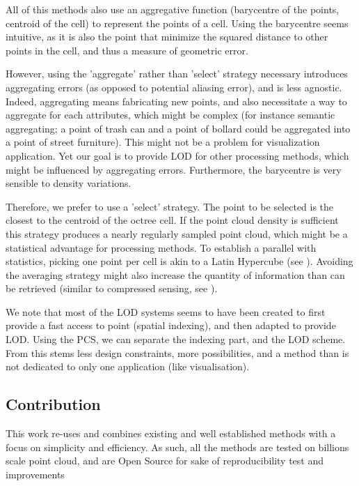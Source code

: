 	All of this methods also use an aggregative function (barycentre of the points, centroid of the cell) to represent the points of a cell.
	Using the barycentre seems intuitive, as it is also the point that minimize the squared distance to other points in the cell, and thus a measure of geometric error.
	
	However, using the 'aggregate' rather than 'select' strategy necessary introduces aggregating errors
	 (as opposed to potential aliasing error), and is less agnostic.
	Indeed, aggregating means fabricating new points, and also necessitate a way to aggregate for each attributes, which might be complex (for instance semantic aggregating; a point of trash can and a point of bollard could be aggregated into a point of street furniture).
	This might not be a problem for visualization application.
	Yet our goal is to provide LOD for other processing methods, which might be influenced by aggregating errors.
	Furthermore, the barycentre is very sensible to density variations.
	
	Therefore, we prefer to use a 'select' strategy. The point to be selected is the closest to the centroid of the octree cell.
	If the point cloud density is sufficient this strategy produces a nearly regularly sampled point cloud, which might be a statistical advantage for processing methods. 
	To establish a parallel with statistics, picking one point per cell is akin to a Latin Hypercube (see \cite{McKay1979}).
	Avoiding the averaging strategy might also increase the quantity of information than can be retrieved (similar to compressed sensing, see \cite{Fornasier2010}).
	
	
	We note that most of the LOD systems seems to have been created to first provide a fast access to point (spatial indexing), and then adapted to provide LOD.
	Using the PCS, we can separate the indexing part, and the LOD scheme. From this stems less design constraints, more possibilities, and a method than is not dedicated to only one application (like visualisation). 
	

\subsection{Contribution}

	This work re-uses and combines existing and well established methods with a focus on simplicity and efficiency. As such, all the methods are tested on billions scale point cloud, and are Open Source for sake of reproducibility test and improvements
	  
